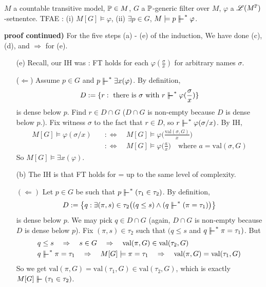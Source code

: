 \documentclass[12pt,a4paper]{article}
\newenvironment{proof}
{\begin{changemargin}{0.5cm}{0.5cm} 
	}%
	{\end{changemargin}
}
\newenvironment{p}
{\begin{proof} 
	}%
	{\end{proof}
}
\begin{document}
 $M$ a countable transitive model, $\mathbb{P} \in M$, $G$ a $\mathbb{P}$-generic filter over $M$, $\varphi$ a $\mathscr{L}(M^{\mathbb{P}})$-setnentce. TFAE : (i) $M[G] \models \varphi$, (ii) $\exists p\in G$, $M\models p \forces^* \varphi$. 
\begin{p}
\textbf{proof continued)} For the five steps (a) - (e) of the induction, We have done (c), (d), and $\Rightarrow$ for (e).
\begin{itemize}
\item[(e)] Recall, our IH was : FT holds for each $\varphi(\frac{\sigma}{x})$ for arbitrary names $\sigma$.

($\Leftarrow$) Assume $p\in G$ and $p\forces^* \exists x(\varphi)$. By definition, 
\begin{align*}
D:= \{r:\text{ there is }\sigma\text{ with }r\forces^* \varphi(\frac{\sigma}{x})\}
\end{align*}
is dense below $p$. Find $r\in D\cap G$ ($D\cap G$ is non-empty because $D$ is dense below $p$.). Fix witness $\sigma$ to the fact that $r\in D$, so $r\forces^* \varphi(\sigma/x)$. By IH, 
\begin{align*}
M[G] \models \varphi(\sigma/x) \quad & :\Leftrightarrow \quad M[G] \models \varphi \big(\frac{\text{val}(\sigma, G)}{x} \big) \\
& :\Leftrightarrow \quad M[G] \models \varphi \big(\frac{a}{x} \big) \quad \text{where } a= \text{val}(\sigma, G) 
\end{align*}
So $M[G] \models \exists x(\varphi)$.
\item[(b)] The IH is that FT holds for = up to the same level of complexity.

$(\Leftarrow)$ Let $p\in G$ be such that $p\forces^* (\tau_1 \in \tau_2)$. By definition,
\begin{align*}
D:= \big\{q: \exists (\pi, s) \in \tau_2 \big( (q\leq s) \wedge (q\forces^* ( \pi= \tau_1 ) \big) \big\}
\end{align*}
is dense below $p$. We may pick $q\in D\cap G$ (again, $D\cap G$ is non-empty because $D$ is dense below $p$). Fix $(\pi, s) \in \tau_2$ such that $( q\leq s$ and $q\forces^* \pi=\tau_1)$. But
\begin{align*}
& q\leq s \quad \Rightarrow \quad s\in G \quad \Rightarrow \quad \text{val}(\pi, G) \in \text{val}(\tau_2, G) \\
& q\forces^* \pi=\tau_1 \quad \Rightarrow \quad M[G] \models \pi =\tau_1 \quad \Rightarrow \quad \text{val}(\pi, G) = \text{val}(\tau_1, G)
\end{align*}
So we get $\text{val}(\pi, G) = \text{val}(\tau_1, G)\in \text{val}(\tau_2, G)$, which is exactly $M[G] \forces (\tau_1 \in \tau_2 )$.
\s


\end{itemize}
\end{p}
\end{document}
